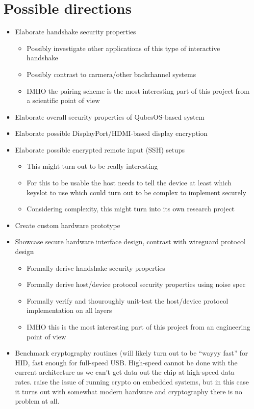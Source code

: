 \documentclass[12pt,a4paper,notitlepage]{article}
\begin{document}
\section{Possible directions}
\begin{itemize}
    \item Elaborate handshake security properties
        \begin{itemize}
            \item Possibly investigate other applications of this type of interactive handshake
            \item Possibly contrast to carmera/other backchannel systems
            \item IMHO the pairing scheme is the most interesting part of this project from a scientific point of view
        \end{itemize}
    \item Elaborate overall security properties of QubesOS-based system
    \item Elaborate possible DisplayPort/HDMI-based display encryption
    \item Elaborate possible encrypted remote input (SSH) setups
        \begin{itemize}
            \item This might turn out to be really interesting
            \item For this to be usable the host needs to tell the device at least which keyslot to use which could turn
                out to be complex to implement securely
            \item Considering complexity, this might turn into its own research project
        \end{itemize}
    \item Create custom hardware prototype
    \item Showcase secure hardware interface design, contrast with wireguard protocol design
        \begin{itemize}
            \item Formally derive handshake security properties
            \item Formally derive host/device protocol security properties using noise spec
            \item Formally verify and thouroughly unit-test the host/device protocol implementation on all layers
            \item IMHO this is the most interesting part of this project from an engineering point of view
        \end{itemize}
    \item Benchmark cryptography routines (will likely turn out to be ``wayyy fast'' for HID, fast enough for full-speed
        USB. High-speed cannot be done with the current architecture as we can't get data out the chip at high-speed
		data rates. \textcite{srivaths01} raise the issue of running crypto on embedded systems, but in this case it
		turns out with somewhat modern hardware and cryptography there is no problem at all.
\end{itemize}
\end{document}

